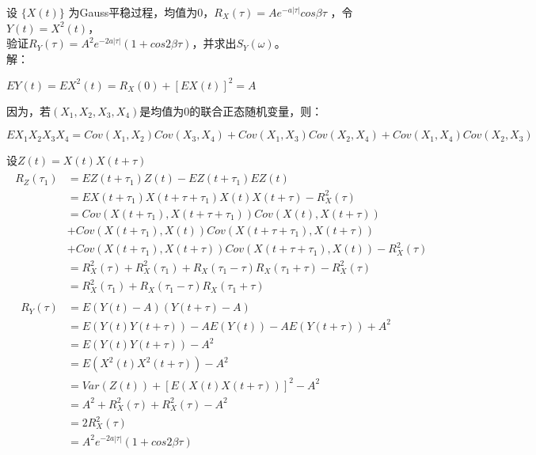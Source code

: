 \documentclass{article}
\begin{document}
\noindent
设 $\{X(t)\rbrace$ 为Gauss平稳过程，均值为0，$R_{X}(\tau) = Ae^{-a|\tau|}cos\beta\tau$ ，令 $Y(t) = X^{2}(t)$，\\
验证$R_{Y}(\tau) = A^{2}e^{-2a|\tau|}(1 + cos2\beta\tau)$，并求出$S_{Y}(\omega)$。\\
解：\\
\begin{center}$EY(t) = EX^{2}(t) = R_{X}(0) + [EX(t)]^{2} = A$\end{center}
因为，若$(X_1,X_2,X_3,X_4)$是均值为0的联合正态随机变量，则：
\begin{center}$EX_1X_2X_3X_4 = Cov(X_1,X_2)Cov(X_3,X_4)
                             + Cov(X_1,X_3)Cov(X_2,X_4)
                             + Cov(X_1,X_4)Cov(X_2,X_3)$\end{center}
设$ Z(t) = X(t)X(t + \tau)$
\begin{align}\begin{split}
R_{Z}(\tau_1) &= EZ(t + \tau_1)Z(t) - EZ(t + \tau_1)EZ(t)\\
		   &= EX(t + \tau_1)X(t + \tau + \tau_1)X(t)X(t + \tau) - R^{2}_{X}(\tau)\\
		   &= Cov(X(t + \tau_1),X(t + \tau + \tau_1))Cov(X(t),X(t + \tau)) \\
		   &+ Cov(X(t + \tau_1),X(t))Cov(X(t + \tau + \tau_1),X(t + \tau)) \\
		   &+ Cov(X(t + \tau_1),X(t + \tau))Cov(X(t + \tau + \tau_1),X(t)) - R^{2}_{X}(\tau)\\
		   &= R_{X}^{2}(\tau) 
		    + R_{X}^{2}(\tau_1) 
		    + R_{X}(\tau_1-\tau) R_{X}(\tau_1+\tau) 
		    - R^{2}_{X}(\tau)\\
		   &= R_{X}^{2}(\tau_1) 
		    + R_{X}(\tau_1-\tau) R_{X}(\tau_1+\tau) 
\end{split}\end{align}
\begin{align}\begin{split}
R_{Y}(\tau) &= E(Y(t) - A)(Y(t + \tau) - A) \\
		    &= E(Y(t)Y(t+\tau)) - AE(Y(t)) - AE(Y(t+\tau)) + A^{2}\\
		    &= E(Y(t)Y(t+\tau)) - A^{2}\\
		    &= E(X^{2}(t)X^{2}(t+\tau)) - A^{2}\\
		    &= Var(Z(t)) + [E(X(t)X(t+\tau))]^{2} - A^{2} \\
		    &= A^{2} + R^{2}_{X}(\tau) + R^{2}_{X}(\tau) - A^{2} \\
		    &= 2R^{2}_{X}(\tau) \\
		    &= A^{2}e^{-2a|\tau|}(1 + cos2\beta\tau)
\end{split}\end{align}
\end{document}
